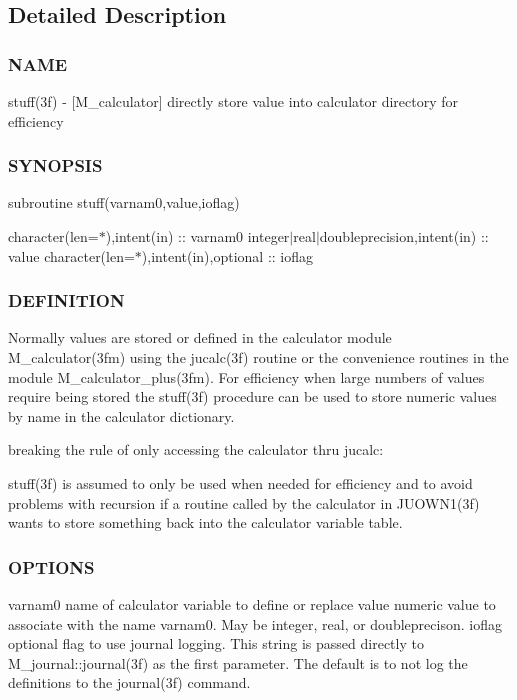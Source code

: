 \subsection{Detailed Description}
\subsubsection*{N\+A\+ME}

stuff(3f) -\/ \mbox{[}M\+\_\+calculator\mbox{]} directly store value into calculator directory for efficiency 

\subsubsection*{S\+Y\+N\+O\+P\+S\+IS}

subroutine stuff(varnam0,value,ioflag)

character(len=$\ast$),intent(in) \+:\+: varnam0 integer$\vert$real$\vert$doubleprecision,intent(in) \+:\+: value character(len=$\ast$),intent(in),optional \+:\+: ioflag

\subsubsection*{D\+E\+F\+I\+N\+I\+T\+I\+ON}

\begin{DoxyVerb}Normally values are stored or defined in the calculator module
M_calculator(3fm) using the jucalc(3f) routine or the convenience
routines in the module M_calculator_plus(3fm).  For efficiency when
large numbers of values require being stored the stuff(3f) procedure
can be used to store numeric values by name in the calculator
dictionary.

breaking the rule of only accessing the calculator thru jucalc:

stuff(3f) is assumed to only be used when needed for efficiency and to
avoid problems with recursion if a routine called by the calculator
in JUOWN1(3f) wants to store something back into the calculator
variable table.
\end{DoxyVerb}


\subsubsection*{O\+P\+T\+I\+O\+NS}

varnam0 name of calculator variable to define or replace value numeric value to associate with the name varnam0. May be integer, real, or doubleprecison. ioflag optional flag to use journal logging. This string is passed directly to M\+\_\+journal\+::journal(3f) as the first parameter. The default is to not log the definitions to the journal(3f) command.

